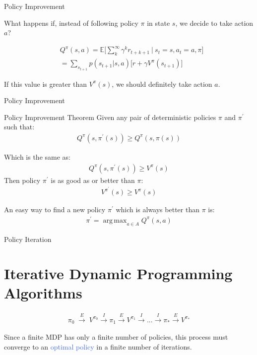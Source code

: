 \documentclass{beamer}
\DeclareMathOperator*{\argmax}{arg\,max}
\begin{document}
\begin{frame}{Policy Improvement}

What happens if, instead of following policy $\pi$ in state $s$, we decide to take action $a$?

\begin{align*}
    &Q^{\pi}(s,a) = \mathds{E} \bigg[\sum_{k}^{\infty}\gamma^{k} r_{t+k+1} \: \bigg| \: s_t=s, a_t=a,\pi \bigg] \\
		   & =  \sum_{s_{t+1}} p(s_{t+1}|s,a)\big[r + \gamma V^{\pi}(s_{t+1}) \big]
\end{align*}

If this value is greater than $V^{\pi}(s)$, we should definitely take action $a$.

\end{frame}

\begin{frame}{Policy Improvement}


\begin{block}{Policy Improvement Theorem}
Given any pair of deterministic policies $\pi$ and $\pi^{\prime}$ such that:
\begin{align*}
Q^{\pi}(s, \pi^{\prime}(s)) \geq Q^{\pi}(s, \pi(s))
\end{align*}

Which is the same as:
\begin{align*}
Q^{\pi}(s, \pi^{\prime}(s)) \geq V^{\pi}(s)
\end{align*}
Then policy $\pi^{\prime}$ is as good as or better than $\pi$:
\begin{align*}
    V^{\pi^{\prime}}(s) \geq V^{\pi}(s)
\end{align*}
\end{block}

\hspace{1mm}

An easy way to find a new policy $\pi^{\prime}$ which is always better than $\pi$ is:
\begin{align*}
    \pi^{\prime} = \argmax_{a \in A} Q^{\pi}(s,a)
\end{align*}

\end{frame}

\begin{frame}{Policy Iteration}
\section{Iterative Dynamic Programming Algorithms}

\begin{align*}
\pi_0 \; \overset{E}{\longrightarrow} \; V^{\pi_0} \overset{I}\longrightarrow \pi_1 \overset{E}\longrightarrow V^{\pi_1} \overset{I}\longrightarrow . . . \overset{I}\longrightarrow \pi_{*} \overset{E}\longrightarrow V^{\pi_*}
\end{align*}

Since a finite MDP has only a finite number of policies, this process must converge to an \textcolor{RoyalBlue}{optimal policy} in a finite number of iterations.

\end{frame}
\end{document}
